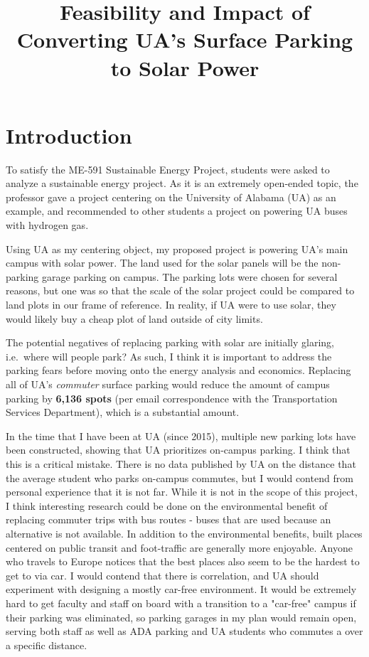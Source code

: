 \documentclass[11pt]{article}
\title{Feasibility and Impact of Converting UA's Surface Parking to
Solar
Power}
\begin{document}
    


\hypertarget{introduction}{%
\section{Introduction}\label{introduction}}

To satisfy the ME-591 Sustainable Energy Project, students were asked to
analyze a sustainable energy project. As it is an extremely open-ended
topic, the professor gave a project centering on the University of
Alabama (UA) as an example, and recommended to other students a project on powering UA buses with hydrogen gas.

Using UA as my centering object, my proposed project is powering UA's
main campus with solar power. The land used for the solar panels will be
the non-parking garage parking on campus. The parking lots were chosen for several reasons, but one was so that the scale of the solar project could be compared to land plots in our frame of reference. In reality, if UA were to use solar, they would likely buy a cheap plot of land outside of city limits.

The potential negatives of replacing parking with solar are
initially glaring, i.e.~where will people park? As such, I think it is
important to address the parking fears before moving onto the energy
analysis and economics. Replacing all of UA's \emph{commuter} surface
parking would reduce the amount of campus parking by \textbf{6,136
spots} (per email correspondence with the Transportation Services
Department), which is a substantial amount. 

In the time that I have been at UA (since 2015), multiple new parking lots have been constructed, showing that UA prioritizes on-campus parking. I think that this is a
critical mistake. There is no data published by UA on the distance that
the average student who parks on-campus commutes, but I would contend
from personal experience that it is not far. While it is not in the
scope of this project, I think interesting research could be done on the
environmental benefit of replacing commuter trips with bus routes -
buses that are used because an alternative is not available. In addition
to the environmental benefits, built places centered on public transit and
foot-traffic are generally more enjoyable. Anyone who travels to Europe
notices that the best places also seem to be the hardest to get to via
car. I would contend that there is correlation, and UA should experiment
with designing a mostly car-free environment. It would be extremely
hard to get faculty and staff on board with a transition to a
"car-free" campus if their parking was eliminated, so parking garages in my plan
would remain open, serving both staff as well as ADA parking and UA
students who commutes a over a specific distance.
\end{document}
